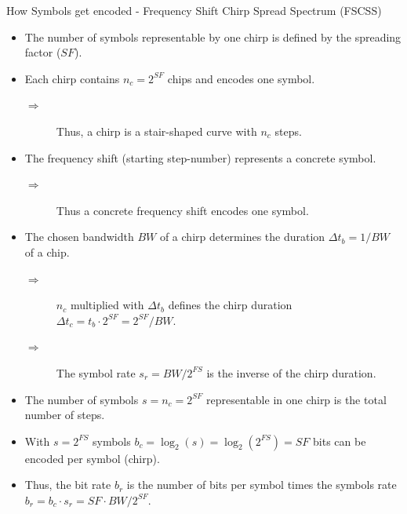 \begin{frame}{How Symbols get encoded - \alert{Frequency Shift} Chirp Spread Spectrum (FSCSS)}
  \begin{itemize}
    \item The number of symbols representable by one chirp is defined by the \alert{spreading factor} ($SF$).
    \item Each chirp contains $n_c = 2^{SF}$ \alert{chips} and encodes one symbol.
    \begin{description}
      \item[$\Rightarrow$] Thus, a chirp is a \alert{stair-shaped curve} with \alert{$n_c$ steps}.
    \end{description}
    \item The \alert{frequency shift} (starting step-number) represents a concrete symbol.
    \begin{description}
      \item[$\Rightarrow$] Thus a \alert{concrete frequency shift encodes one symbol}.
    \end{description}
    \item The chosen \alert{bandwidth $BW$ of a chirp} determines the \alert{duration} $\Delta t_b = 1 / BW$ of a \alert{chip}.
    \begin{description}
      \item[$\Rightarrow$] $n_c$ multiplied with $\Delta t_b$ defines the \alert{chirp duration} $\Delta t_c = t_b \cdot 2^{SF} = 2^{SF} / BW$.
      \item[$\Rightarrow$] The \alert{symbol rate} $s_r = BW / 2^{FS}$ is the \alert{inverse of the chirp duration}.
    \end{description}
    \item The \alert{number of symbols} $s = n_c = 2^{SF}$ \alert{representable in one} chirp is the \alert{total number of steps}.
    \item With $s = 2^{FS}$ symbols \alert{$b_c = \log_2(s) = \log_2(2^{FS})= SF$ bits} can be encoded per symbol (chirp).
    \item Thus, the \alert{bit rate} $b_r$ is the number of \alert{bits per symbol} times the \alert{symbols rate} $b_r = b_c \cdot s_r =  SF \cdot BW / 2^{SF}$.
  \end{itemize}
\end{frame}
